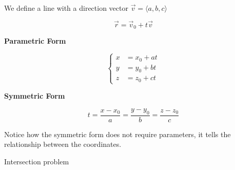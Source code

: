\begin{definition}
	We define a line with a direction vector $\vec v = \langle a, b, c \rangle$

	\begin{equation}
		\vec r = \vec v_0 + t \vec v
	\end{equation}

	\textbf{Parametric Form}

	\begin{equation}
		\begin{cases}
			x &= x_0 + at\\
			y &= y_0 + bt\\
			z &= z_0 + ct
		\end{cases}
	\end{equation}

	\textbf{Symmetric Form}

	\begin{equation}
		t = \frac{x - x_0}{a} = \frac{y - y_0}{b} = \frac{z - z_0}{c}
	\end{equation}

	Notice how the symmetric form does not require parameters, it tells the relationship between the coordinates.
\end{definition}

\begin{example}
	Intersection problem
\end{example}